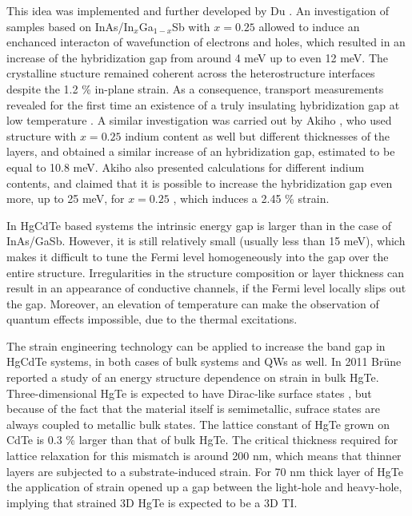 \documentclass[titlepage,a4paper]{book}
\begin{document}
This idea was implemented and further developed by Du \cite{Du_State2}. An investigation of samples based on InAs/In$_x$Ga$_{1-x}$Sb with $x = 0.25$ allowed to induce an enchanced interacton of wavefunction of electrons and holes, which resulted in an increase of the hybridization gap from around 4 meV up to even 12 meV. The crystalline stucture remained coherent across the heterostructure interfaces despite the 1.2 \% in-plane strain. As a consequence, transport measurements revealed for the first time an existence of a truly insulating hybridization gap at low temperature \cite{Du_State2}. A similar investigation was carried out by Akiho \cite{Akiho_State}, who used structure with $x = 0.25$ indium content as well but different thicknesses of the layers, and obtained a similar increase of an hybridization gap, estimated to be equal to 10.8 meV. Akiho also presented calculations for different indium contents, and claimed that it is possible to increase the hybridization gap even more, up to 25 meV, for $x = 0.25$ \cite{Akiho_State}, which induces a 2.45 \% strain.

In HgCdTe based systems the intrinsic energy gap is larger than in the case of InAs/GaSb. However, it is still relatively small (usually less than 15 meV), which makes it difficult to tune the Fermi level homogeneously into the gap over the entire structure. Irregularities in the structure composition or layer thickness can result in an appearance of conductive channels, if the Fermi level locally slips out the gap. Moreover, an elevation of temperature can make the observation of quantum effects impossible, due to the thermal excitations. 

The strain engineering technology can be applied to increase the band gap in HgCdTe systems, in both cases of bulk systems and QWs as well. In 2011 Brüne reported \cite{Brune_State} a study of an energy structure dependence on strain in bulk HgTe. Three-dimensional HgTe is expected to have Dirac-like surface states \cite{Pankratov_State}, but because of the fact that the material itself is semimetallic, sufrace states are always coupled to metallic bulk states. The lattice constant of HgTe grown on CdTe is 0.3 \% larger than that of bulk HgTe. The critical thickness required for lattice relaxation for this mismatch is around 200 nm, which means that thinner layers are subjected to a substrate-induced strain. For 70 nm thick layer of HgTe \cite{Brune_State} the application of strain opened up a gap between the light-hole and heavy-hole, implying that strained 3D HgTe is expected to be a 3D TI.
\end{document}
